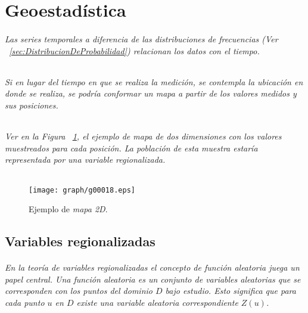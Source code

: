 \part{Geoestadística}
\paragraph{
Las \emph{series temporales} a diferencia de las \emph{distribuciones de frecuencias} (Ver ~\ref{sec:DistribucionDeProbabilidad}) relacionan los datos con el tiempo.
}
\paragraph*{
Si en lugar del tiempo en que se realiza la medición, se contempla la ubicación en donde se realiza, se podría conformar un \emph{mapa} a partir de los \emph{valores medidos} y sus \emph{posiciones}\footnotemark[9].
}
\paragraph*{
Ver en la Figura ~\ref{fig:Mapa2D}, el ejemplo de mapa de dos dimensiones con los valores muestreados para cada posición\footnotemark[10]. La población de esta muestra estaría representada por una \emph{variable regionalizada}.
}
\begin{figure}[ht]
\centering
\texttt{[image: graph/g00018.eps]}
\caption[Ejemplo de \emph{mapa 2D}]{Ejemplo de \emph{mapa 2D}.}
\label{fig:Mapa2D}
\end{figure}




\chapter{Variables regionalizadas}
\paragraph{
En la teoría de variables regionalizadas el concepto de \emph{función aleatoria} juega un papel central. Una \emph{función aleatoria} es un conjunto de \emph{variables aleatorias} que se corresponden con los puntos del dominio $D$ bajo estudio. Esto significa que para cada punto $u$ en $D$ existe una \emph{variable aleatoria} correspondiente $Z(u)$\cite{BARDOSSY}.
}

